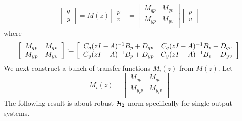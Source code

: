 \begin{equation}\label{freq_domain_mapping}
\left[
    \begin{array}{c}
        {q}\\
        {y} 
    \end{array}\right]
=
{M}(z)
\left[
    \begin{array}{c}
        {p}\\
        {v} 
    \end{array}\right]
=
\left[
\begin{array}{cc}
    M_{qp}&M_{qv}\\
    M_{yp}&M_{yv}\\
\end{array}\right]
\left[
\begin{array}{c}
    {p}\\
    {v} 
\end{array}\right]
\end{equation}
where 
\begin{equation}\label{eqn:constrM}
\left[
\begin{array}{cc}
    M_{qp}&M_{qv}\\
    M_{yp}&M_{yv}\\
\end{array}\right] \coloneqq 
\left[
\begin{array}{cc}
    {C_q}(z{I}-{A})^{-1}{B_p}+D_{qp}&{C_q}(z{I}-{A})^{-1}{B_v}+{D_{qv}}\\
    {C_y}(z{I}-{A})^{-1}{B_p}+{D_{yp}}&{C_y}(z{I}-{A})^{-1}{B_v}+D_{yv}\\
\end{array}\right]\\
\end{equation}
We next construct a bunch of transfer functions \(M_i(z)\) from $M(z)$.
Let 
\begin{equation}\label{constrM_i}
M_i(z)=
\left[
    \begin{array}{cc}
        M_{qp}&M_{qv}\\
        M_{y_i p}&M_{y_i v}\\
    \end{array}\right]
\end{equation}
The following result is about robust ${\cal H}_2$ norm specifically for single-output systems.
